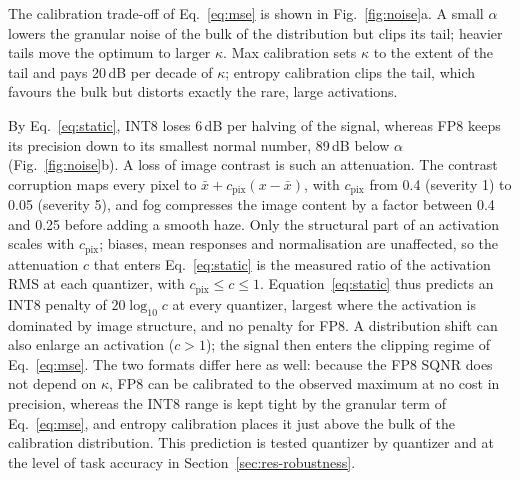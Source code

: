 \documentclass[pdflatex,sn-mathphys-num]{sn-jnl}%
\theoremstyle{thmstyleone}%
\theoremstyle{thmstyletwo}%
\theoremstyle{thmstylethree}%
\begin{document}
\begin{appendices}
The calibration trade-off of Eq.~\eqref{eq:mse} is shown in Fig.~\ref{fig:noise}a. A small $\alpha$ lowers the granular noise of the bulk of the distribution but clips its tail; heavier tails move the optimum to larger $\kappa$. Max calibration sets $\kappa$ to the extent of the tail and pays 20\,dB per decade of $\kappa$; entropy calibration clips the tail, which favours the bulk but distorts exactly the rare, large activations.

By Eq.~\eqref{eq:static}, INT8 loses 6\,dB per halving of the signal, whereas FP8 keeps its precision down to its smallest normal number, 89\,dB below $\alpha$ (Fig.~\ref{fig:noise}b). A loss of image contrast is such an attenuation. The contrast corruption maps every pixel to $\bar x+c_\mathrm{pix}(x-\bar x)$, with $c_\mathrm{pix}$ from 0.4 (severity 1) to 0.05 (severity 5), and fog compresses the image content by a factor between 0.4 and 0.25 before adding a smooth haze. Only the structural part of an activation scales with $c_\mathrm{pix}$; biases, mean responses and normalisation are unaffected, so the attenuation $c$ that enters Eq.~\eqref{eq:static} is the measured ratio of the activation RMS at each quantizer, with $c_\mathrm{pix}\le c\le1$. Equation~\eqref{eq:static} thus predicts an INT8 penalty of $20\log_{10}c$ at every quantizer, largest where the activation is dominated by image structure, and no penalty for FP8. A distribution shift can also enlarge an activation ($c>1$); the signal then enters the clipping regime of Eq.~\eqref{eq:mse}. The two formats differ here as well: because the FP8 SQNR does not depend on $\kappa$, FP8 can be calibrated to the observed maximum at no cost in precision, whereas the INT8 range is kept tight by the granular term of Eq.~\eqref{eq:mse}, and entropy calibration places it just above the bulk of the calibration distribution. This prediction is tested quantizer by quantizer and at the level of task accuracy in Section~\ref{sec:res-robustness}.


\end{appendices}
\end{document}
